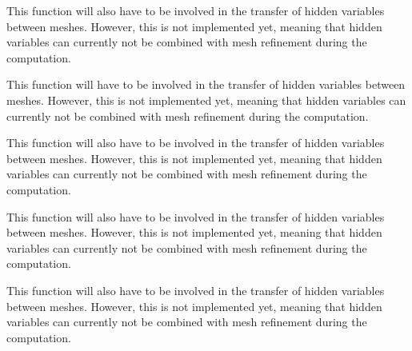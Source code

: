 \begin{DoxyRefList}
%
This function will also have to be involved in the transfer of hidden variables between meshes. However, this is not implemented yet, meaning that hidden variables can currently not be combined with mesh refinement during the computation.  
\item[Member \mbox{\hyperlink{classparallel_1_1_triangulation_system_a79e9789e83e12900c85cf8de0644271f}{parallel::Triangulation\+System$<$ spacedim $>$::pre\+\_\+refinement\+\_\+domain}} ()]\label{todo__todo000014}%
%
This function will have to be involved in the transfer of hidden variables between meshes. However, this is not implemented yet, meaning that hidden variables can currently not be combined with mesh refinement during the computation.  
\item[Member \mbox{\hyperlink{class_triangulation_system_a62be2563cc8d810a71941e15490f9840}{Triangulation\+System$<$ spacedim $>$::execute\+\_\+coarsening\+\_\+and\+\_\+refinement}} ()]\label{todo__todo000013}%
%
This function will also have to be involved in the transfer of hidden variables between meshes. However, this is not implemented yet, meaning that hidden variables can currently not be combined with mesh refinement during the computation.  
\item[Member \mbox{\hyperlink{class_triangulation_system_a8435489384095f687363d200ccfce628}{Triangulation\+System$<$ spacedim $>$::post\+\_\+refinement\+\_\+domain}} ()]\label{todo__todo000012}%
%
This function will also have to be involved in the transfer of hidden variables between meshes. However, this is not implemented yet, meaning that hidden variables can currently not be combined with mesh refinement during the computation.  
\item[Member \mbox{\hyperlink{class_triangulation_system_ae1862e6da3157dc8d539fdc0439e9f48}{Triangulation\+System$<$ spacedim $>$::pre\+\_\+refinement\+\_\+domain}} ()]\label{todo__todo000011}%
%
This function will also have to be involved in the transfer of hidden variables between meshes. However, this is not implemented yet, meaning that hidden variables can currently not be combined with mesh refinement during the computation. 
\end{DoxyRefList}